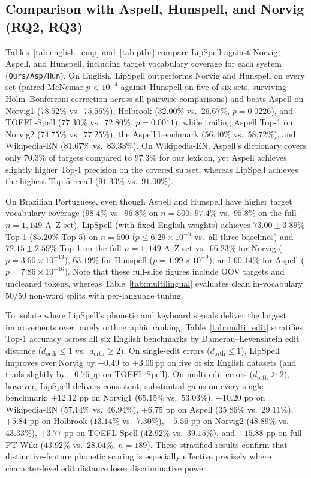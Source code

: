 \documentclass[preprint,12pt,authoryear]{elsarticle}
\begin{document}
\subsection{Comparison with Aspell, Hunspell, and Norvig (RQ2, RQ3)}
Tables~\ref{tab:english_cmp} and~\ref{tab:ptbr} compare LipSpell against Norvig, Aspell, and Hunspell, including target vocabulary coverage for each system (\texttt{Ours/Asp/Hun}). On English, LipSpell outperforms Norvig and Hunspell on every set (paired McNemar $p < 10^{-4}$ against Hunspell on five of six sets, surviving Holm--Bonferroni correction \citep{holm1979simple} across all pairwise comparisons) and beats Aspell on Norvig1 ($78.52\%$ vs.\ $75.56\%$), Holbrook ($32.00\%$ vs.\ $26.67\%$, $p=0.0226$), and TOEFL-Spell ($77.30\%$ vs.\ $72.80\%$, $p=0.0011$), while trailing Aspell Top-1 on Norvig2 ($74.75\%$ vs.\ $77.25\%$), the Aspell benchmark ($56.40\%$ vs.\ $58.72\%$), and Wikipedia-EN ($81.67\%$ vs.\ $83.33\%$). On Wikipedia-EN, Aspell's dictionary covers only $70.3\%$ of targets compared to $97.3\%$ for our lexicon, yet Aspell achieves slightly higher Top-1 precision on the covered subset, whereas LipSpell achieves the highest Top-5 recall ($91.33\%$ vs.\ $91.00\%$).

On Brazilian Portuguese, even though Aspell and Hunspell have higher target vocabulary coverage ($98.4\%$ vs.\ $96.8\%$ on $n=500$; $97.4\%$ vs.\ $95.8\%$ on the full $n=1{,}149$ A--Z set), LipSpell (with fixed English weights) achieves $73.00\pm3.89\%$ Top-1 ($85.20\%$ Top-5) on $n=500$ ($p \le 6.29\times 10^{-5}$ vs.\ all three baselines) and $72.15\pm2.59\%$ Top-1 on the full $n=1{,}149$ A--Z set vs.\ $66.23\%$ for Norvig ($p=3.60\times 10^{-13}$), $63.19\%$ for Hunspell ($p=1.99\times 10^{-9}$), and $60.14\%$ for Aspell ($p=7.86\times 10^{-16}$). Note that these full-slice figures include OOV targets and uncleaned tokens, whereas Table~\ref{tab:multilingual} evaluates clean in-vocabulary $50/50$ non-word splits with per-language tuning.

To isolate where LipSpell's phonetic and keyboard signals deliver the largest improvements over purely orthographic ranking, Table~\ref{tab:multi_edit} stratifies Top-1 accuracy across all six English benchmarks by Damerau--Levenshtein edit distance ($d_{\text{orth}} \le 1$ vs.\ $d_{\text{orth}} \ge 2$). On single-edit errors ($d_{\text{orth}} \le 1$), LipSpell improves over Norvig by $+0.49$ to $+3.06$\,pp on five of six English datasets (and trails slightly by $-0.76$\,pp on TOEFL-Spell). On multi-edit errors ($d_{\text{orth}} \ge 2$), however, LipSpell delivers consistent, substantial gains on every single benchmark: $+12.12$ pp on Norvig1 ($65.15\%$ vs.\ $53.03\%$), $+10.20$ pp on Wikipedia-EN ($57.14\%$ vs.\ $46.94\%$), $+6.75$ pp on Aspell ($35.86\%$ vs.\ $29.11\%$), $+5.84$ pp on Holbrook ($13.14\%$ vs.\ $7.30\%$), $+5.56$ pp on Norvig2 ($48.89\%$ vs.\ $43.33\%$), $+3.77$ pp on TOEFL-Spell ($42.92\%$ vs.\ $39.15\%$), and $+15.88$ pp on full PT-Wiki ($43.92\%$ vs.\ $28.04\%$, $n=189$). These stratified results confirm that distinctive-feature phonetic scoring is especially effective precisely where character-level edit distance loses discriminative power.
\end{document}

